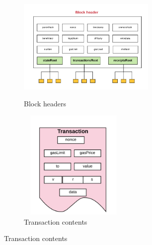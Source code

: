 \begin{figure}[!ht]
\begin{subfigure}{.5\textwidth}
\centering
\includegraphics[width=250px, height=200px]{figures/block-headers.png}
\caption{Block headers \cite{preethi}}
\label{blocks}
\end{subfigure}
\begin{subfigure}{.5\textwidth}
\centering
\includegraphics[width=200px, height=200px]{figures/transaction-contents.png}
\caption{Transaction contents \cite{preethi}}
\label{transactions}
\end{subfigure}
\end{figure}


